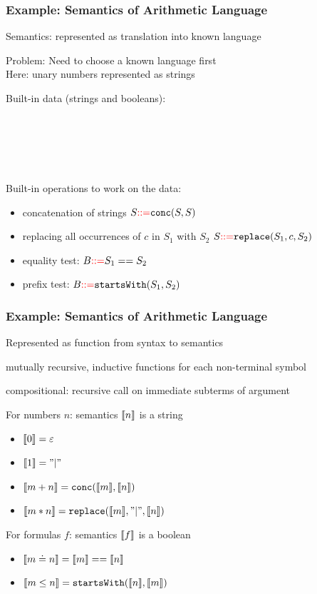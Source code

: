 \begin{frame}\frametitle{Example: Semantics of Arithmetic Language}
Semantics: represented as translation into known language
\medskip

Problem: Need to choose a known language first\\
Here: unary numbers represented as strings

Built-in data (strings and booleans):
\begin{commgrammar}
\\
\\
\\
\\
\end{commgrammar}

Built-in operations to work on the data:
\begin{itemize}
\item concatenation of strings $S{\color{red}::=} \mathtt{conc}(S,S)$
\item replacing all occurrences of $c$ in $S_1$ with $S_2$ $S{\color{red}::=} \mathtt{replace}(S_1,c,S_2)$
\item equality test: $B{\color{red}::=} S_1==S_2$
\item prefix test: $B{\color{red}::=} \mathtt{startsWith}(S_1,S_2)$
\end{itemize}
\end{frame}

\begin{frame}\frametitle{Example: Semantics of Arithmetic Language}
\begin{blockitems}{Represented as function from syntax to semantics}
\item mutually recursive, inductive functions for each non-terminal symbol
\item compositional: recursive call on immediate subterms of argument
\end{blockitems}

For numbers $n$: semantics $\llbracket n\rrbracket$ is a string
\begin{itemize}
\item $\llbracket 0\rrbracket=\varepsilon$
\item $\llbracket 1\rrbracket="|"$
\item $\llbracket m+n\rrbracket=\mathtt{conc}(\llbracket m\rrbracket,\llbracket n\rrbracket)$
\item $\llbracket m*n\rrbracket=\mathtt{replace}(\llbracket m\rrbracket,"|",\llbracket n\rrbracket)$
\end{itemize}
\medskip

For formulas $f$: semantics $\llbracket f\rrbracket$ is a boolean
\begin{itemize}
\item $\llbracket m\doteq n\rrbracket=\llbracket m\rrbracket==\llbracket n\rrbracket$
\item $\llbracket m\leq n\rrbracket=\mathtt{startsWith}(\llbracket n\rrbracket,\llbracket m\rrbracket)$
\end{itemize}
\end{frame}

